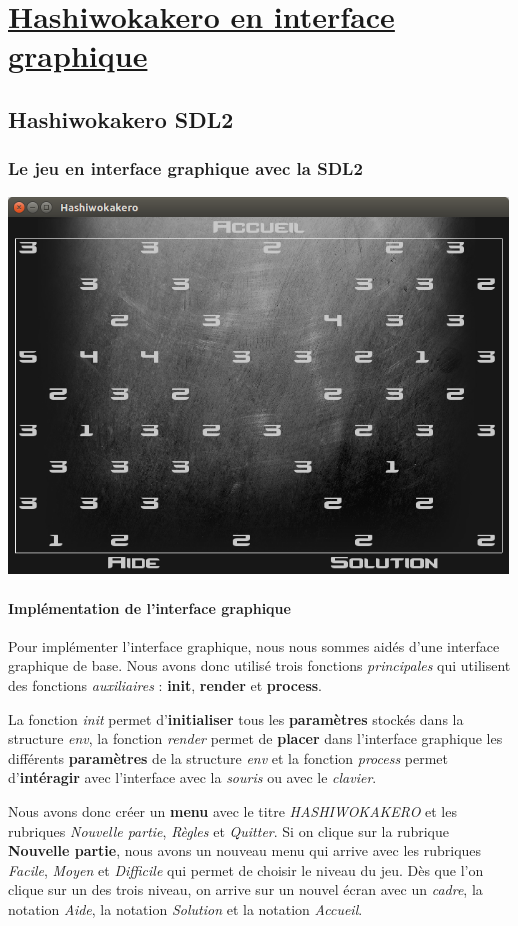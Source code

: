 \documentclass[12]{report}
\begin{document}
\part{\underline{Hashiwokakero en interface graphique}}
	\chapter{Hashiwokakero SDL2}
		\section{Le jeu en interface graphique avec la SDL2}
		\includegraphics[height=10cm]{hashiwokakeroSDL.png}
		\subsection{Implémentation de l'interface graphique}
                Pour implémenter l'interface graphique, nous nous sommes aidés d'une interface graphique de base. Nous avons donc utilisé trois fonctions \emph{principales} qui utilisent des fonctions \emph{auxiliaires} : \textbf{init}, \textbf{render} et \textbf{process}.

                La fonction \emph{init} permet d'\textbf{initialiser} tous les \textbf{paramètres} stockés dans la structure \emph{env}, la fonction \emph{render} permet de \textbf{placer} dans l'interface graphique les différents \textbf{paramètres} de la structure \emph{env} et la fonction \emph{process} permet d'\textbf{intéragir} avec l'interface avec la \emph{souris} ou avec le \emph{clavier}.

                Nous avons donc créer un \textbf{menu} avec le titre \emph{HASHIWOKAKERO} et les rubriques \emph{Nouvelle partie}, \emph{Règles} et \emph{Quitter}. Si on clique sur la rubrique \textbf{Nouvelle partie}, nous avons un nouveau menu qui arrive avec les rubriques \emph{Facile}, \emph{Moyen} et \emph{Difficile} qui permet de choisir le niveau du jeu. Dès que l'on clique sur un des trois niveau, on arrive sur un nouvel écran avec un \emph{cadre}, la notation \emph{Aide}, la notation \emph{Solution} et la notation \emph{Accueil}.
\end{document}

